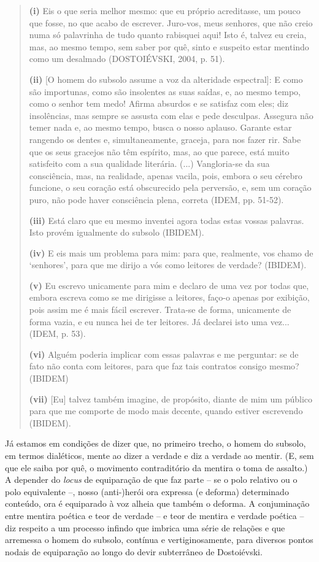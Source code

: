 \begin{quote}
\textbf{(i)} Eis o que seria melhor mesmo: que eu próprio acreditasse,
um pouco que fosse, no que acabo de escrever. Juro-vos, meus senhores,
que não creio numa só palavrinha de tudo quanto rabisquei aqui! Isto é,
talvez eu creia, mas, ao mesmo tempo, sem saber por quê, sinto e
suspeito estar mentindo como um desalmado (DOSTOIÉVSKI, 2004, p. 51).

\textbf{(ii)} {[}O homem do subsolo assume a voz da alteridade
espectral{]}: E como são importunas, como são insolentes as suas saídas,
e, ao mesmo tempo, como o senhor tem medo! Afirma absurdos e se satisfaz
com eles; diz insolências, mas sempre se assusta com elas e pede
desculpas. Assegura não temer nada e, ao mesmo tempo, busca o nosso
aplauso. Garante estar rangendo os dentes e, simultaneamente, graceja,
para nos fazer rir. Sabe que os seus gracejos não têm espírito, mas, ao
que parece, está muito satisfeito com a sua qualidade literária. (...)
Vangloria-se da sua consciência, mas, na realidade, apenas vacila, pois,
embora o seu cérebro funcione, o seu coração está obscurecido pela
perversão, e, sem um coração puro, não pode haver consciência plena,
correta (IDEM, pp. 51-52).

\textbf{(iii)} Está claro que eu mesmo inventei agora todas estas vossas
palavras. Isto provém igualmente do subsolo (IBIDEM).

\textbf{(iv)} E eis mais um problema para mim: para que, realmente, vos
chamo de `senhores', para que me dirijo a vós como leitores de verdade?
(IBIDEM).

\textbf{(v)} Eu escrevo unicamente para mim e declaro de uma vez por
todas que, embora escreva como se me dirigisse a leitores, faço-o apenas
por exibição, pois assim me é mais fácil escrever. Trata-se de forma,
unicamente de forma vazia, e eu nunca hei de ter leitores. Já declarei
isto uma vez... (IDEM, p. 53).

\textbf{(vi)} Alguém poderia implicar com essas palavras e me perguntar:
se de fato não conta com leitores, para que faz tais contratos consigo
mesmo? (IBIDEM)

\textbf{(vii)} {[}Eu{]} talvez também imagine, de propósito, diante de
mim um público para que me comporte de modo mais decente, quando estiver
escrevendo (IBIDEM).
\end{quote}

Já estamos em condições de dizer que, no primeiro trecho, o homem do
subsolo, em termos dialéticos, mente ao dizer a verdade e diz a verdade
ao mentir. (E, sem que ele saiba por quê, o movimento contraditório da
mentira o toma de assalto.) A depender do \emph{locus} de equiparação de
que faz parte -- se o polo relativo ou o polo equivalente --, nosso
(anti-)herói ora expressa (e deforma) determinado conteúdo, ora é
equiparado à voz alheia que também o deforma. A conjuminação entre
mentira poética e teor de verdade -- e teor de mentira e verdade poética
-- diz respeito a um processo infindo que imbrica uma série de relações
e que arremessa o homem do subsolo, contínua e vertiginosamente, para
diversos pontos nodais de equiparação ao longo do devir subterrâneo de
Dostoiévski.

